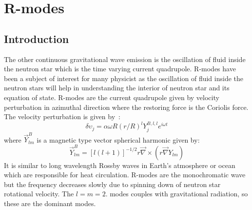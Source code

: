 \documentclass{ttuthes2007}
\begin{document}
\chapter{\textbf{R-modes}}

\section{Introduction}
The other continuous gravitational wave emission is the oscillation of fluid
inside the neutron star which is the time varying current quadrupole.  R-modes
have been a subject of interest for many physicist as the oscillation of fluid
inside the neutron stars  will help in understanding the interior of neutron
star and its equation of state. R-modes are the current quadrupole  given by
velocity perturbation in azimuthal direction
where the restoring force is the Coriolis force. 
The velocity perturbation is given by~\cite{Owen:1998xg}:
\begin{equation}
\delta{\upsilon_j}=\alpha\omega R(r/R)^ l Y_j^{B,l,l}e^{i \omega t}
\end{equation}
where $\vec{Y}_{lm}^B$ is a magnetic type vector spherical harmonic given by:
\begin{equation}
\vec{Y}_{lm}^B=[l(l+1)]^{-1/2} r \vec{\nabla} \times (r \vec{\nabla}Y_{lm})
\end{equation}
It is similar to long
wavelength Rossby waves in Earth's atmosphere or ocean which are responsible for
heat circulation. R-modes are the monochromatic wave but the frequency decreases
slowly due to spinning down of neutron star rotational velocity.  The $l=m=2$.
modes couples with gravitational radiation, so these are the dominant modes.
\end{document}
